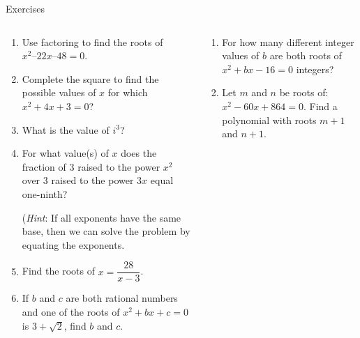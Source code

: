 \documentclass[9pt,aspectratio=169]{beamer}
\begin{document}
\begin{frame}{Exercises}
  \begin{columns}[T]
    \begin{column}{0.5\textwidth}
      \begin{enumerate}
        \item Use factoring to find the roots of $x^2 – 22x – 48 = 0$.
        \item Complete the square to find the possible values of $x$ for which $x^2 + 4x + 3 = 0$?
        \item What is the value of $i^3$?
        \item For what value(s) of $x$ does the fraction of $3$ raised to the power $x^2$ over $3$ raised to the power $3x$ equal one-ninth?  
        
        (\emph{Hint}: If all exponents have the same base, then we can solve the problem by equating the exponents.
        \item Find the roots of $x = \dfrac{28}{x - 3}$.
        \item If $b$ and $c$ are both rational numbers and one of the roots of $x^2 + bx + c = 0$ is $3 + \sqrt{2}$, find $b$ and $c$.
        \seti
      \end{enumerate}
    \end{column}
    \begin{column}{0.5\textwidth}
      \begin{enumerate}
        \conti
        \item For how many different integer values of $b$ are both roots of $x^2 + bx - 16 = 0$ integers?
        \item Let $m$ and $n$ be roots of: $x^2 − 60x + 864 = 0$.  Find a polynomial with roots $m + 1$ and $n + 1$.
      \end{enumerate}
    \end{column}
  \end{columns}
\end{frame}
\end{document}
